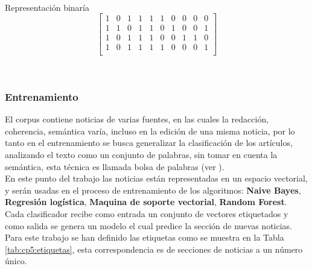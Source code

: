 \ \\

\begin{mygraybox}[label={box:cp5:binario}]{Representación binaría} 
\begin{equation*}
\begin{bmatrix}
1 & 0 & 1 & 1 & 1 & 1 & 0 & 0 & 0 & 0\\
1 & 1 & 0 & 1 & 1 & 0 & 1 & 0 & 0 & 1\\
1 & 0 & 1 & 1 & 1 & 0 & 0 & 1 & 1 & 0\\
1 & 0 & 1 & 1 & 1 & 1 & 0 & 0 & 0 & 1\\
\end{bmatrix}
\end{equation*}
\end{mygraybox}

\ \\

\subsubsection{Entrenamiento}


El corpus contiene noticias de varias fuentes, en  las cuales la redacción, coherencia, semántica varía, incluso en la edición de una misma noticia, por lo tanto en el entrenamiento se busca generalizar la clasificación de los artículos, analizando el texto como un conjunto de palabras, sin tomar en cuenta la semántica, esta técnica es llamada bolsa de palabras (ver ).\\

En este punto del trabajo las noticias están representadas en un espacio vectorial, y serán usadas en el proceso de entrenamiento de los algoritmos: \textbf{Naive Bayes}, \textbf{Regresión logística}, \textbf{Maquina de soporte vectorial}, \textbf{Random Forest}. Cada clasificador recibe como entrada un conjunto de vectores etiquetados y como salida se genera un modelo el cual predice la sección de nuevas noticias.\\ 

Para este trabajo se han definido las etiquetas como se muestra en la Tabla \ref{tab:cp5:etiquetas}, esta correspondencia es de secciones de noticias a un número único.\\


